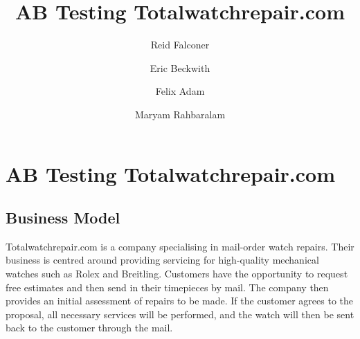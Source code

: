 \documentclass[12pt, authoryear]{elsarticle}
\begin{document}
\begin{frontmatter}  %

\title{AB Testing Totalwatchrepair.com}

\author[Add1]{Reid Falconer}

\author[Add1]{Eric Beckwith}

\author[Add1]{Felix Adam}
\author[Add1]{Maryam Rahbaralam}

\address[Add1]{Barcelona Graduate School of Economics, Barcelona, Spain}




\end{frontmatter}

\headsep 35pt %
\section*{AB Testing Totalwatchrepair.com}\label{ab_testing}

\subsection*{Business Model}
Totalwatchrepair.com is a company specialising in mail-order watch repairs. Their business is centred around providing servicing for high-quality mechanical watches such as Rolex and Breitling.  Customers have the opportunity to request free estimates and then send in their timepieces by mail. The company then provides an initial assessment of repairs to be made. If the customer agrees to the proposal, all necessary services will be performed, and the watch will then be sent back to the customer through the mail. 
\end{document}
